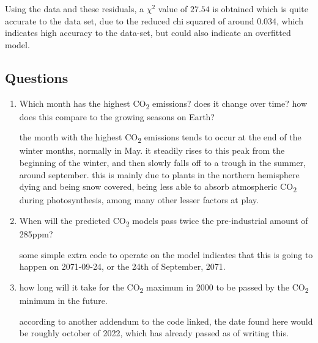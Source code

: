 \documentclass{article}
\begin{document}
Using the data and these residuals, a \(\chi^2\) value of \(27.54\) is obtained
which is quite accurate to the data set, due to the reduced chi squared of around
0.034, which indicates high accuracy to the data-set, but could also indicate
an overfitted model. 

\pagebreak
\subsection*{Questions}

\begin{enumerate}[label=\alph*)]
    \item Which month has the highest CO\textsubscript{2} emissions? 
    does it change over time? how does this compare to the growing seasons on Earth?

    the month with the highest CO\textsubscript{2} emissions tends to occur at the end of the winter months,
    normally in May. it steadily rises to this peak from the beginning of the winter, and then slowly falls off
    to a trough in the summer, around september. this is mainly due to plants in the
    northern hemisphere dying and being snow covered, being less able to absorb atmospheric
    CO\textsubscript{2} during photosynthesis, among many other lesser factors at play.

    \item When will the predicted CO\textsubscript{2} models pass twice the 
    pre-industrial amount of 285ppm?

    some simple extra code to operate on the model indicates that this is going to happen 
    on 2071-09-24, or the 24th of September, 2071.

    \item how long will it take for the CO\textsubscript{2} maximum in 2000
    to be passed by the CO\textsubscript{2} minimum in the future.

    according to another addendum to the code linked, the date found here would be roughly
    october of 2022, which has already passed as of writing this.

\end{enumerate}
\end{document}
